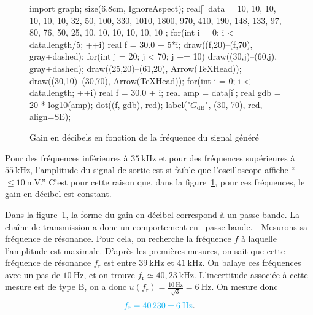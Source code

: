 \documentclass[a4paper,twocolumn,10pt]{report}
\begin{document}
	\begin{figure}[H]
		\centering
		\begin{asy}
			import graph;
			size(6.8cm, IgnoreAspect);
			real[] data = {
				10, 10, 10, 10, 10, 10,
				32, 50, 100, 330, 1010, 1800,
				970, 410, 190, 148, 133, 97,
				80, 76, 50, 25,
				10, 10, 10, 10, 10, 10
			};
			for(int i = 0; i < data.length/5; ++i) {
				real f = 30.0 + 5*i;
				draw((f,20)--(f,70), gray+dashed);
			}
			for(int j = 20; j < 70; j += 10) {
				draw((30,j)--(60,j), gray+dashed);
			}
			draw((25,20)--(61,20), Arrow(TeXHead));
			draw((30,10)--(30,70), Arrow(TeXHead));
			for(int i = 0; i < data.length; ++i) {
				real f = 30.0 + i;
				real amp = data[i];
				real gdb = 20 * log10(amp);
				dot((f, gdb), red);
			}
			label("\Large$G_\mathrm{dB}$", (30, 70), red, align=SE);
		\end{asy}
		\caption{Gain en décibels en fonction de la fréquence du signal généré}
		\label{fig:gdb-passe-bande}
	\end{figure}

		Pour des fréquences inférieures à $35\:\mathrm{kHz}$\/ et pour des fréquences supérieures à $55\:\mathrm{kHz}$, l'amplitude du signal de sortie est si faible que l'oscilloscope affiche \hbox{``$\le 10\:\mathrm{mV}$.''} C'est pour cette raison que, dans la figure~\ref{fig:gdb-passe-bande}, pour ces fréquences, le gain en décibel est constant.

	Dans la figure~\ref{fig:gdb-passe-bande}, la forme du gain en décibel correspond à un passe bande. La chaîne de transmission a donc un comportement en \guillemotleft~passe-bande.~\guillemotright\ Mesurons sa fréquence de résonance. Pour cela, on recherche la fréquence $f$\/ à laquelle l'amplitude est maximale. D'après les premières mesures, on sait que cette fréquence de résonance $f_{\mathrm{r}}$\/ est entre $39\:\mathrm{kHz}$\/ et $41\:\mathrm{kHz}$. On balaye ces fréquences avec un pas de $10\:\mathrm{Hz}$, et on trouve $f_\mathrm{r} \simeq 40{,}23\:\mathrm{kHz}$.
	L'incertitude associée à cette mesure est de type B, on a donc $u(f_\mathrm{r}) = \frac{10\:\mathrm{Hz}}{\sqrt{3}} = 6\:\mathrm{Hz}$. On mesure donc \[
		{\color{cyan} f_\mathrm{r} = 40\,230 \pm 6\:\mathrm{Hz}}
	.\]
\end{document}
